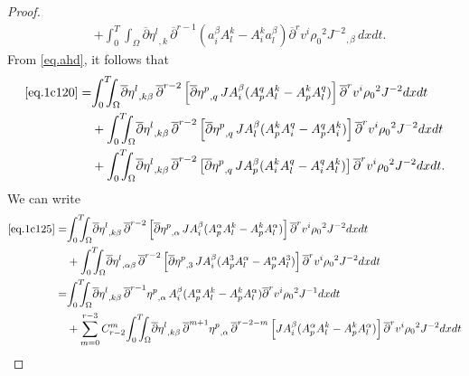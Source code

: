 \documentclass[12pt,twoside,reqno]{amsart}
\numberwithin{equation}{section}
\theoremstyle{definition}
\theoremstyle{remark}
\begin{document}
\begin{proof}
\begin{align}
  &+{\int_0^T\!\!\!\!\int_\Omega }  {\overline{\partial}} {{{\eta^l}}_{,{k}}\,}{\overline{\partial}}^{r-1}(a^\beta_iA^k_l-A^k_ia^\beta_l){\overline{\partial}}^r v^i{\rho_0}^2 {{{J^{-2}}}_{,{\beta}}\,} dxdt.\label{eq.1c124}
\end{align}
From \eqref{eq.ahd}, it follows that
\begin{align}
  \eqref{eq.1c120}=&{\int_0^T\!\!\!\!\int_\Omega }  {\overline{\partial}} {{{\eta^l}}_{,{k\beta}}\,}{\overline{\partial}}^{r-2}\left[{{{{\overline{\partial}}\eta^p}}_{,{q}}\,}J A^\beta_i(A^q_pA^k_l-A^k_pA^q_l)\right] {\overline{\partial}}^r v^i{\rho_0}^2  J^{-2}dxdt\label{eq.1c125}\\
  &+{\int_0^T\!\!\!\!\int_\Omega }  {\overline{\partial}} {{{\eta^l}}_{,{k\beta}}\,}{\overline{\partial}}^{r-2}\left[{{{{\overline{\partial}}\eta^p}}_{,{q}}\,}J A^\beta_l(A^k_pA^q_i-A^q_pA^k_i)\right] {\overline{\partial}}^r v^i{\rho_0}^2  J^{-2}dxdt\label{eq.1c126}\\
  &+{\int_0^T\!\!\!\!\int_\Omega }  {\overline{\partial}} {{{\eta^l}}_{,{k\beta}}\,}{\overline{\partial}}^{r-2}\left[{{{{\overline{\partial}}\eta^p}}_{,{q}}\,}J A^\beta_p(A^k_iA^q_l-A^q_iA^k_l)\right] {\overline{\partial}}^r v^i{\rho_0}^2  J^{-2}dxdt.\label{eq.1c127}
\end{align}
We can write
\begin{align}
  \eqref{eq.1c125}=&{\int_0^T\!\!\!\!\int_\Omega }  {\overline{\partial}} {{{\eta^l}}_{,{k\beta}}\,}{\overline{\partial}}^{r-2}\left[{{{{\overline{\partial}}\eta^p}}_{,{\alpha}}\,}J A^\beta_i(A^\alpha_pA^k_l-A^k_pA^\alpha_l)\right] {\overline{\partial}}^r v^i{\rho_0}^2  J^{-2}dxdt{\nonumber}\\
  &+{\int_0^T\!\!\!\!\int_\Omega }  {\overline{\partial}} {{{\eta^l}}_{,{\alpha\beta}}\,}{\overline{\partial}}^{r-2}\left[{{{{\overline{\partial}}\eta^p}}_{,{3}}\,}J A^\beta_i(A^3_pA^\alpha_l-A^\alpha_pA^3_l)\right] {\overline{\partial}}^r v^i{\rho_0}^2  J^{-2}dxdt{\nonumber}\\
  =&{\int_0^T\!\!\!\!\int_\Omega }  {\overline{\partial}} {{{\eta^l}}_{,{k\beta}}\,}{{{{\overline{\partial}}^{r-1}\eta^p}}_{,{\alpha}}\,} A^\beta_i(A^\alpha_pA^k_l-A^k_pA^\alpha_l) {\overline{\partial}}^r v^i{\rho_0}^2  J^{-1}dxdt\label{eq.1c128}\\
  &+\sum_{m=0}^{r-3}C_{r-2}^m{\int_0^T\!\!\!\!\int_\Omega }  {\overline{\partial}} {{{\eta^l}}_{,{k\beta}}\,}{{{{\overline{\partial}}^{m+1}\eta^p}}_{,{\alpha}}\,}{\overline{\partial}}^{r-2-m}\left[J A^\beta_i(A^\alpha_pA^k_l-A^k_pA^\alpha_l)\right]{\overline{\partial}}^r v^i{\rho_0}^2  J^{-2}dxdt\label{eq.1c129}\\

\end{align}
\end{proof}
\end{document}
